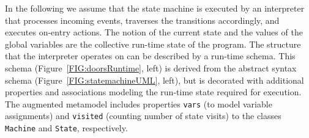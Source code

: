 \documentclass[english,crc]{programming}
\begin{document}

In the following we assume that the state machine is executed by an interpreter that processes
incoming events, traverses the transitions accordingly, and executes on-entry actions. The notion
of the current state and the values of the global variables are the collective run-time state of
the program. The structure that the interpreter operates on can be described by a run-time schema.
This schema (Figure~\ref{FIG:doorsRuntime}, left) is derived from the abstract syntax
schema (Figure~\ref{FIG:statemachineUML}, left), but is decorated with additional properties and
associations modeling the run-time state required for execution. The augmented metamodel includes
properties \lstinline{vars} (to model variable assignments) and \lstinline{visited} (counting
number of state visits) to the classes \lstinline{Machine} and \lstinline{State}, respectively.



\end{document}
